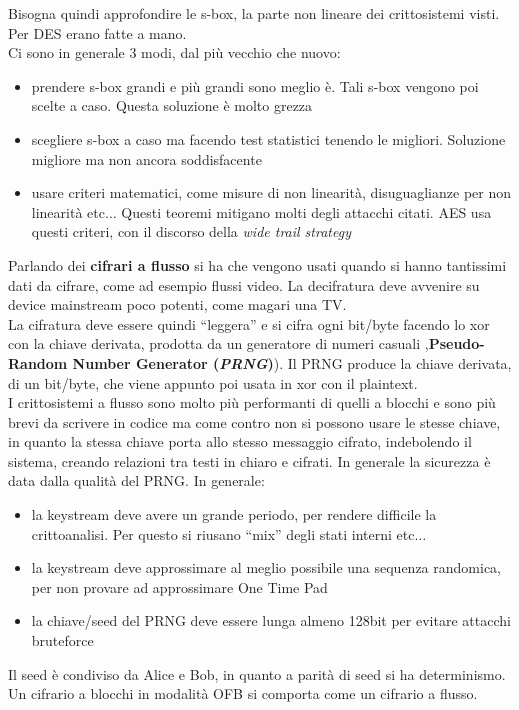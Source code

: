 \documentclass[a4paper,12pt, oneside]{book}
\begin{document}
Bisogna quindi approfondire le s-box, la parte non lineare dei crittosistemi
visti. Per DES erano fatte a mano.\\
Ci sono in generale 3 modi, dal più vecchio che nuovo:
\begin{itemize}
  \item prendere s-box grandi e più grandi sono meglio è. Tali s-box vengono poi
  scelte a caso. Questa soluzione è molto grezza
  \item scegliere s-box a caso ma facendo test statistici tenendo le
  migliori. Soluzione migliore ma non ancora soddisfacente
  \item usare criteri matematici, come misure di non linearità, disuguaglianze
  per non linearità etc$\ldots$ Questi teoremi mitigano molti degli attacchi
  citati. AES usa questi criteri, con il discorso della \textit{wide trail
    strategy} 
\end{itemize}
Parlando dei \textbf{cifrari a flusso} si ha che vengono usati quando si hanno
tantissimi dati da cifrare, come ad esempio flussi video. La decifratura deve
avvenire su device mainstream poco potenti, come magari una TV.\\
La cifratura deve essere quindi ``leggera'' e si cifra ogni bit/byte facendo lo
xor con la chiave derivata, prodotta da un generatore di numeri casuali
,\textbf{Pseudo-Random Number Generator (\textit{PRNG})}). Il PRNG produce la
chiave derivata, di un bit/byte, che viene appunto poi usata in xor con il
plaintext.\\
I crittosistemi a flusso sono molto più performanti di quelli a blocchi e sono
più brevi da scrivere in codice ma come contro non si possono usare le stesse
chiave, in quanto la stessa chiave porta allo stesso messaggio cifrato,
indebolendo il sistema, creando relazioni tra testi in chiaro e cifrati. In
generale la sicurezza è data dalla qualità del PRNG. In generale:
\begin{itemize}
  \item la keystream deve avere un grande periodo, per rendere difficile la
  crittoanalisi. Per questo si riusano ``mix'' degli stati interni etc$\ldots$
  \item la keystream deve approssimare al meglio possibile una sequenza
  randomica, per non provare ad approssimare One Time Pad
  \item la chiave/seed del PRNG deve essere lunga almeno 128bit per evitare
  attacchi bruteforce
\end{itemize}
Il seed è condiviso da Alice e Bob, in quanto a parità di seed si ha
determinismo.\\  
Un cifrario a blocchi in modalità OFB si comporta come un cifrario a flusso.\\
\end{document}
